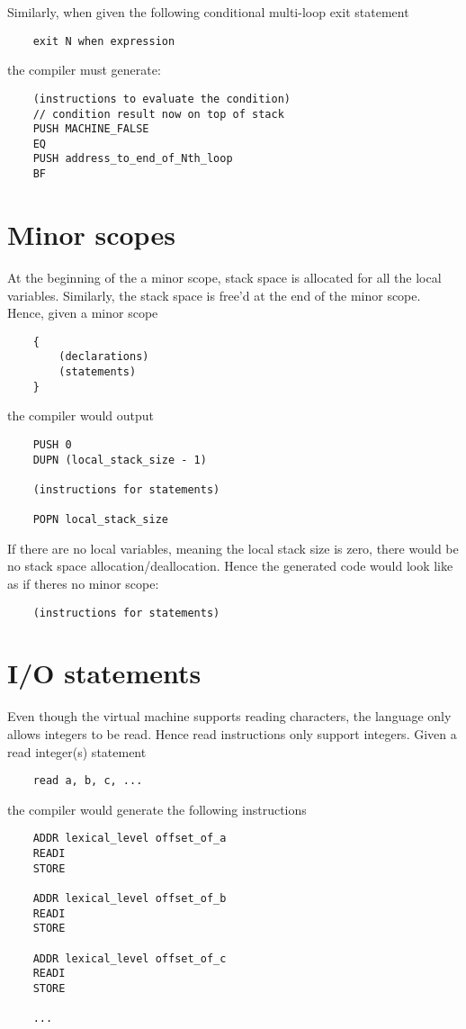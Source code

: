 \documentclass{article}
\begin{document}
\noindent
Similarly, when given the following conditional multi-loop exit statement
\begin{lstlisting}
    exit N when expression
\end{lstlisting}
the compiler must generate:
\begin{lstlisting}
    (instructions to evaluate the condition)
    // condition result now on top of stack
    PUSH MACHINE_FALSE
    EQ
    PUSH address_to_end_of_Nth_loop
    BF
\end{lstlisting}

\section{Minor scopes}

At the beginning of the a minor scope, stack space is allocated for all the local variables. Similarly, the stack space is free'd at the end of the minor scope.
\newline
\newline
Hence, given a minor scope
\begin{lstlisting}
    {
        (declarations)
        (statements)
    }
\end{lstlisting}
the compiler would output
\begin{lstlisting}
    PUSH 0
    DUPN (local_stack_size - 1)
    
    (instructions for statements)
    
    POPN local_stack_size
\end{lstlisting}

\noindent
If there are no local variables, meaning the local stack size is zero, there would be no stack space allocation/deallocation. Hence the generated code would look like as if theres no minor scope:
\begin{lstlisting}
    (instructions for statements)
\end{lstlisting}

\newpage
\section{I/O statements}

Even though the virtual machine supports reading characters, the language only allows integers to be read. Hence read instructions only support integers.
\newline
\newline
Given a read integer(s) statement
\begin{lstlisting}
    read a, b, c, ...
\end{lstlisting}
the compiler would generate the following instructions
\begin{lstlisting}
    ADDR lexical_level offset_of_a
    READI
    STORE
    
    ADDR lexical_level offset_of_b
    READI
    STORE
    
    ADDR lexical_level offset_of_c
    READI
    STORE
    
    ...
\end{lstlisting}
\end{document}
